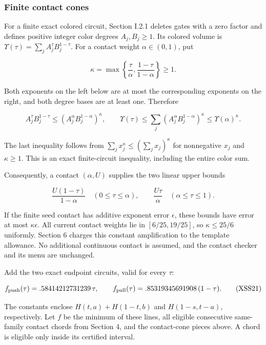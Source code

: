 \hypertarget{af-a9ec399514-finite-contact-cones}{%
\subsubsection{Finite contact cones}\label{af-a9ec399514-finite-contact-cones}}

For a finite exact colored circuit, Section I.2.1 deletes gates with a zero factor and defines positive integer color degrees \(A_j,B_j\ge1\). Its colored volume is \(\Upsilon(\tau)=\sum_j A_j^\tau B_j^{1-\tau}\). For a contact weight \(\alpha\in(0,1)\), put

\[
\kappa=\max\left\{\frac{\tau}{\alpha},
                  \frac{1-\tau}{1-\alpha}\right\}\ge1.
\]

Both exponents on the left below are at most the corresponding exponents on the right, and both degree bases are at least one. Therefore

\[
A_j^\tau B_j^{1-\tau}
 \le\left(A_j^\alpha B_j^{1-\alpha}\right)^\kappa,
\qquad
\Upsilon(\tau)
 \le\sum_j\left(A_j^\alpha B_j^{1-\alpha}\right)^\kappa
 \le\Upsilon(\alpha)^\kappa.
\]

The last inequality follows from \(\sum_jx_j^\kappa\le(\sum_jx_j)^\kappa\) for nonnegative \(x_j\) and \(\kappa\ge1\). This is an exact finite-circuit inequality, including the entire color sum.

Consequently, a contact \((\alpha,U)\) supplies the two linear upper bounds

\[
\frac{U(1-\tau)}{1-\alpha}\quad(0\le\tau\le\alpha),
\qquad
\frac{U\tau}{\alpha}\quad(\alpha\le\tau\le1).
\]

If the finite seed contact has additive exponent error \(\epsilon\), these bounds have error at most \(\kappa\epsilon\). All current contact weights lie in \([6/25,19/25]\), so \(\kappa\le25/6\) uniformly. Section 6 charges this constant amplification to the template allowance. No additional continuous contact is assumed, and the contact checker and its menu are unchanged.

Add the two exact endpoint circuits, valid for every \(\tau\):

\[
f_{\rm push}(\tau)=.58414212731239\,\tau,\qquad
 f_{\rm pull}(\tau)=.85319345691908\,(1-\tau).
 \tag{XSS21}
\]

The constants enclose \(H(t,a)+H(1-t,b)\) and \(H(1-s,t-a)\), respectively. Let \(f\) be the minimum of these lines, all eligible consecutive same-family contact chords from Section 4, and the contact-cone pieces above. A chord is eligible only inside its certified interval.

